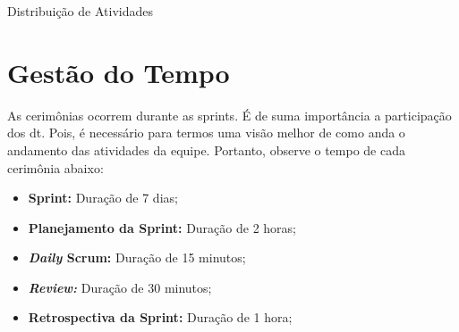 \begin{quadro}[H]
	\centering\footnotesize
    \ABNTEXfontereduzida
    \caption{Distribuição de Atividades}
    \label{divisao-atividade}
\end{quadro}

\section{Gestão do Tempo}
As cerimônias ocorrem durante as \gls{sprints}. É de suma importância a participação dos \ac{dt}. Pois, é necessário para termos uma visão melhor de como anda o andamento das atividades da equipe. Portanto, observe o tempo de cada cerimônia abaixo:
\begin{itemize}
    \item \textbf{Sprint:} Duração de 7 dias;
    \item \textbf{Planejamento da Sprint:} Duração de 2 horas;
    \item \textbf{\emph{Daily} Scrum:} Duração de 15 minutos;
    \item \textbf{\emph{Review:}} Duração de 30 minutos;
    \item \textbf{Retrospectiva da Sprint:}  Duração de 1 hora;
\end{itemize}

